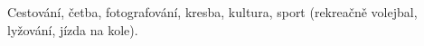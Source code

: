 \begin{cvhonors}

  \cvhonor
    {} %
    {Cestování, četba, fotografování, kresba, kultura, sport (rekreačně volejbal, lyžování, jízda na kole).} %

\end{cvhonors}
\vspace{5pt}


